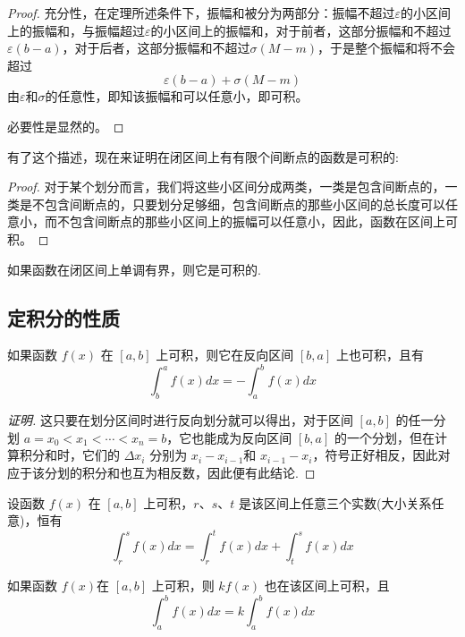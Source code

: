 \begin{proof}
  充分性，在定理所述条件下，振幅和被分为两部分：振幅不超过$\varepsilon$的小区间上的振幅和，与振幅超过$\varepsilon$的小区间上的振幅和，对于前者，这部分振幅和不超过$\varepsilon (b-a)$，对于后者，这部分振幅和不超过$\sigma(M-m)$，于是整个振幅和将不会超过
  \[ \varepsilon(b-a)+\sigma(M-m) \]
  由$\varepsilon$和$\sigma$的任意性，即知该振幅和可以任意小，即可积。

  必要性是显然的。
\end{proof}

有了这个描述，现在来证明在闭区间上有有限个间断点的函数是可积的:
\begin{proof}
  对于某个划分而言，我们将这些小区间分成两类，一类是包含间断点的，一类是不包含间断点的，只要划分足够细，包含间断点的那些小区间的总长度可以任意小，而不包含间断点的那些小区间上的振幅可以任意小，因此，函数在区间上可积。
\end{proof}

\begin{theorem}
  如果函数在闭区间上单调有界，则它是可积的.
\end{theorem}


\subsection{定积分的性质}
\label{sec:properties-of-definite-integral}

\begin{property}
  如果函数 $f(x)$ 在 $[a,b]$ 上可积，则它在反向区间 $[b,a]$ 上也可积，且有
  \[ \int_b^a f(x) dx = - \int_a^b f(x) dx \]
\end{property}

\begin{proof}[证明]
  这只要在划分区间时进行反向划分就可以得出，对于区间 $[a,b]$ 的任一分划 $a=x_0<x_1<\cdots<x_n=b$，它也能成为反向区间 $[b,a]$ 的一个分划，但在计算积分和时，它们的 $\Delta x_i$ 分别为 $x_i-x_{i-1}$和 $x_{i-1}-x_i$，符号正好相反，因此对应于该分划的积分和也互为相反数，因此便有此结论.
\end{proof}

\begin{property}
  设函数 $f(x)$ 在 $[a,b]$ 上可积，$r$、$s$、$t$ 是该区间上任意三个实数(大小关系任意)，恒有
  \[ \int_r^s f(x) dx = \int_r^t f(x) dx + \int_t^s f(x) dx \]
\end{property}

\begin{property}
  如果函数 $f(x)$在 $[a,b]$ 上可积，则 $kf(x)$ 也在该区间上可积，且
  \[ \int_a^b f(x) dx = k \int_a^b f(x) dx  \]
\end{property}

